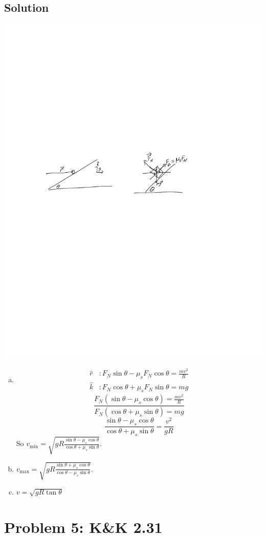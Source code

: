 \documentclass[solutions]{esg8012pset}
\begin{document}
\subsection*{Solution}
  \begin{center}\includegraphics[width=.5\textwidth]{2009-10-02_Diagram_4_0}\end{center}
  \begin{enumerate}[a)]
    \item \begin{align*}
    \hat r & : F_N\sin\theta -\mu_s F_N\cos\theta = \frac{m v^2}{R} \\
    \hat k & : F_N\cos\theta +\mu_s F_N\sin\theta = mg
    \end{align*}
    $$\frac{F_N(\sin\theta -\mu_s\cos\theta) = \frac{m v^2}{R}}{F_N(\cos\theta +\mu_s \sin\theta) = mg}$$
    $$\frac{\sin\theta -\mu_s\cos\theta}{\cos\theta +\mu_s \sin\theta} = \frac{v^2}{g R}$$
    So $v_{\text{min}} = \sqrt{g R\frac{\sin\theta -\mu_s\cos\theta}{\cos\theta +\mu_s \sin\theta}}$.
    \item $v_{\text{max}} = \sqrt{g R\frac{\sin\theta +\mu_s\cos\theta}{\cos\theta -\mu_s \sin\theta}}$.
    \item $v = \sqrt{g R\tan\theta}$
  \end{enumerate}
\section*{Problem 5: K\&K 2.31}
\end{document}
